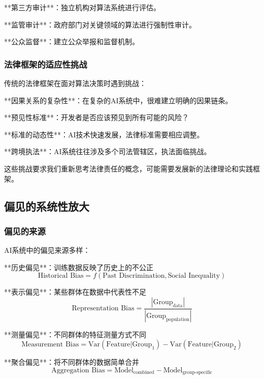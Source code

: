 **第三方审计**：独立机构对算法系统进行评估。

**监管审计**：政府部门对关键领域的算法进行强制性审计。

**公众监督**：建立公众举报和监督机制。

\subsubsection{法律框架的适应性挑战}

传统的法律框架在面对算法决策时遇到挑战：

**因果关系的复杂性**：在复杂的AI系统中，很难建立明确的因果链条。

**预见性标准**：开发者是否应该预见到所有可能的风险？

**标准的动态性**：AI技术快速发展，法律标准需要相应调整。

**跨境执法**：AI系统往往涉及多个司法管辖区，执法面临挑战。

这些挑战要求我们重新思考法律责任的概念，可能需要发展新的法律理论和实践框架。

\subsection{偏见的系统性放大}

\subsubsection{偏见的来源}

AI系统中的偏见来源多样：

**历史偏见**：训练数据反映了历史上的不公正
\begin{equation}
\text{Historical Bias} = f(\text{Past Discrimination}, \text{Social Inequality})
\end{equation}

**表示偏见**：某些群体在数据中代表性不足
\begin{equation}
\text{Representation Bias} = \frac{|\text{Group}_{\text{data}}|}{|\text{Group}_{\text{population}}|}
\end{equation}

**测量偏见**：不同群体的特征测量方式不同
\begin{equation}
\text{Measurement Bias} = \text{Var}(\text{Feature}|\text{Group}_1) - \text{Var}(\text{Feature}|\text{Group}_2)
\end{equation}

**聚合偏见**：将不同群体的数据简单合并
\begin{equation}
\text{Aggregation Bias} = \text{Model}_{\text{combined}} - \text{Model}_{\text{group-specific}}
\end{equation}

